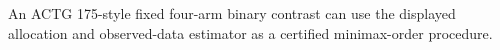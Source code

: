 An ACTG 175-style fixed four-arm binary contrast can use the displayed allocation and observed-data estimator as a certified minimax-order procedure.